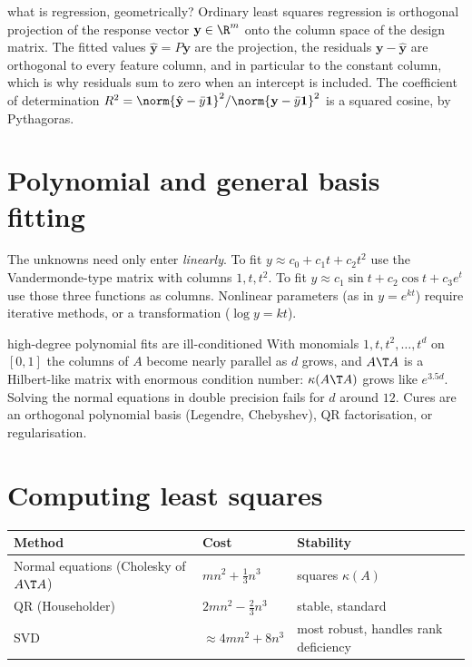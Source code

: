 \begin{interview}{what is regression, geometrically?}
Ordinary least squares regression is orthogonal projection of the response vector $\mathbf{y}\in\R^m$ onto the column space of the design matrix. The fitted values $\hat{\mathbf{y}}=P\mathbf{y}$ are the projection, the residuals $\mathbf{y}-\hat{\mathbf{y}}$ are orthogonal to every feature column, and in particular to the constant column, which is why residuals sum to zero when an intercept is included. The coefficient of determination $R^2=\norm{\hat{\mathbf{y}}-\bar{y}\mathbf{1}}^2/\norm{\mathbf{y}-\bar{y}\mathbf{1}}^2$ is a squared cosine, by Pythagoras.
\end{interview}

\section{Polynomial and general basis fitting}

The unknowns need only enter \emph{linearly}. To fit $y\approx c_0+c_1t+c_2t^2$ use the Vandermonde-type matrix with columns $1,t,t^2$. To fit $y\approx c_1\sin t+c_2\cos t+c_3e^t$ use those three functions as columns. Nonlinear parameters (as in $y=e^{kt}$) require iterative methods, or a transformation ($\log y=kt$).

\begin{nuance}{high-degree polynomial fits are ill-conditioned}
With monomials $1,t,t^2,\dots,t^{d}$ on $[0,1]$ the columns of $A$ become nearly parallel as $d$ grows, and $A\T A$ is a Hilbert-like matrix with enormous condition number: $\kappa(A\T A)$ grows like $e^{3.5d}$. Solving the normal equations in double precision fails for $d$ around $12$. Cures are an orthogonal polynomial basis (Legendre, Chebyshev), QR factorisation, or regularisation.
\end{nuance}

\section{Computing least squares}

\begin{center}
\begin{tabular}{lll}
\toprule
Method & Cost & Stability \\
\midrule
Normal equations (Cholesky of $A\T A$) & $mn^2+\tfrac13n^3$ & squares $\kappa(A)$ \\
QR (Householder) & $2mn^2-\tfrac23n^3$ & stable, standard \\
SVD & $\approx4mn^2+8n^3$ & most robust, handles rank deficiency \\
\bottomrule
\end{tabular}
\end{center}

